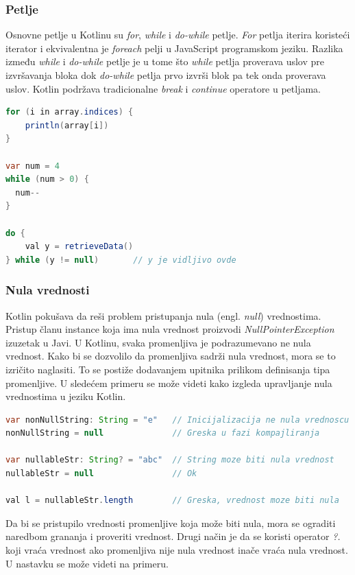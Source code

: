 \documentclass[12pt,oneside]{memoir}
\begin{document}
\subsubsection{Petlje}
Osnovne petlje u Kotlinu su \emph{for}, \emph{while} i \emph{do-while} petlje. \emph{For} petlja iterira koristeći iterator i ekvivalentna je \emph{foreach} pelji u JavaScript programskom jeziku. Razlika između \emph{while} i \emph{do-while} petlje je u tome što \emph{while} petlja proverava uslov pre izvršavanja bloka dok \emph{do-while} petlja prvo izvrši blok pa tek onda proverava uslov. Kotlin podržava tradicionalne \emph{break} i \emph{continue} operatore u petljama.

\begin{lstlisting}[caption={Petlje u Kotlin jeziku},captionpos=t, language=Java]
for (i in array.indices) {
    println(array[i])
}

var num = 4 
while (num > 0) {
  num--
}

do {
    val y = retrieveData()
} while (y != null)       // y je vidljivo ovde 
\end{lstlisting}

\subsubsection{Nula vrednosti}
Kotlin pokušava da reši problem pristupanja nula (engl. \emph{null}) vrednostima. Pristup članu instance koja ima nula vrednost proizvodi \emph{NullPointerException} izuzetak u Javi. U Kotlinu, svaka promenljiva je podrazumevano ne nula vrednost. Kako bi se dozvolilo da promenljiva sadrži nula vrednost, mora se to izričito naglasiti. To se postiže dodavanjem upitnika prilikom definisanja tipa promenljive. U sledećem primeru se može videti kako izgleda upravljanje nula vrednostima u jeziku Kotlin.

\begin{lstlisting}[caption={Dodela nula vrednosti},captionpos=t, language=Java]
var nonNullString: String = "e"   // Inicijalizacija ne nula vrednoscu
nonNullString = null              // Greska u fazi kompajliranja

var nullableStr: String? = "abc"  // String moze biti nula vrednost
nullableStr = null                // Ok

val l = nullableStr.length        // Greska, vrednost moze biti nula
\end{lstlisting}

Da bi se pristupilo vrednosti promenljive koja može biti nula, mora se ograditi naredbom grananja i proveriti vrednost. Drugi način je da se koristi operator \emph{?.} koji vraća vrednost ako promenljiva nije nula vrednost inače vraća nula vrednost. U nastavku se može videti na primeru.
\end{document}
